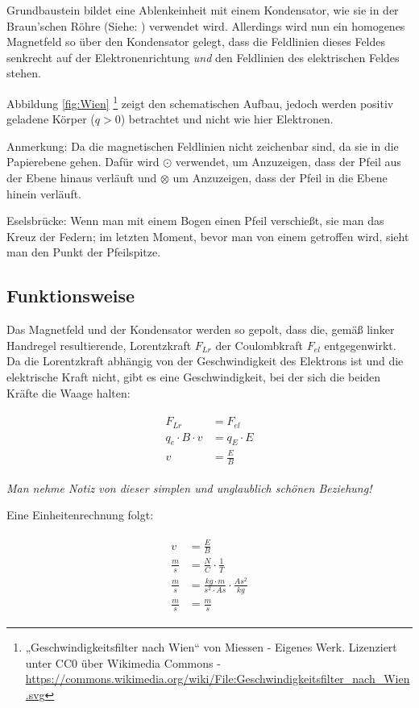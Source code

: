 Grundbaustein bildet eine Ablenkeinheit mit einem Kondensator, wie sie in der Braun'schen Röhre (Siehe: ) verwendet wird. Allerdings wird nun ein homogenes Magnetfeld so über den Kondensator gelegt, dass die Feldlinien dieses Feldes senkrecht auf der Elektronenrichtung \emph{und} den Feldlinien des elektrischen Feldes stehen.

Abbildung \ref{fig:Wien} \footnote{„Geschwindigkeitsfilter nach Wien“ von Miessen - Eigenes Werk. Lizenziert unter CC0 über Wikimedia Commons - \url{https://commons.wikimedia.org/wiki/File:Geschwindigkeitsfilter\_nach\_Wien.svg}} zeigt den schematischen Aufbau, jedoch werden positiv geladene Körper ($q>0$) betrachtet und nicht wie hier Elektronen.


\begin{leftbar}
	Anmerkung: Da die magnetischen Feldlinien nicht zeichenbar sind, da sie \glqq in die Papierebene\grqq{} gehen. Dafür wird $\odot$ verwendet, um Anzuzeigen, dass der Pfeil aus der Ebene hinaus verläuft und $\otimes$ um Anzuzeigen, dass der Pfeil in die Ebene hinein verläuft.
	
	Eselsbrücke: Wenn man mit einem Bogen einen Pfeil verschießt, sie man das Kreuz der Federn; im letzten Moment, bevor man von einem getroffen wird, sieht man den Punkt der Pfeilspitze.
\end{leftbar}



\subsection{Funktionsweise}

Das Magnetfeld und der Kondensator werden so gepolt, dass die, gemäß linker Handregel resultierende, Lorentzkraft $F_{Lr}$ der Coulombkraft $F_{el}$ entgegenwirkt. Da die Lorentzkraft abhängig von der Geschwindigkeit des Elektrons ist und die elektrische Kraft nicht, gibt es eine Geschwindigkeit, bei der sich die beiden Kräfte die Waage halten:

\begin{align}
\begin{split}
	F_{Lr} &= F_{el} \\
	q_e \cdot B \cdot v &= q_E \cdot E \\
	v &= \frac{E}{B}
\end{split}
\end{align}

\noindent \emph{Man nehme Notiz von dieser simplen und unglaublich schönen Beziehung!}

Eine Einheitenrechnung folgt:

\begin{align}
\begin{split}
	v &= \frac{E}{B} \\
	\frac{m}{s} &= \frac{N}{C} \cdot \frac{1}{T} \\
	\frac{m}{s} &= \frac{kg \cdot m}{s^2 \cdot As} \cdot \frac{As^2}{kg} \\
	\frac{m}{s} &= \frac{m}{s}
\end{split}
\end{align}


















